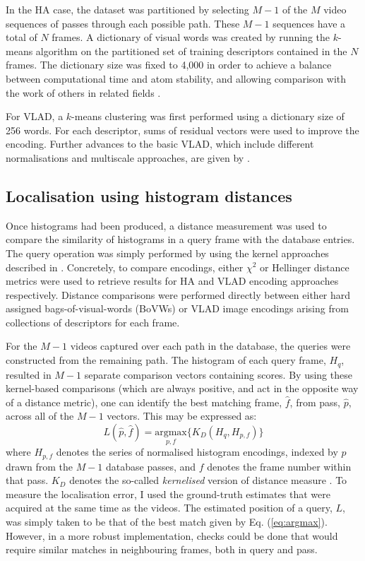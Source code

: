 In the HA case, the dataset was partitioned by selecting $M-1$ of the $M$ video sequences of passes through each possible path. These $M-1$ sequences have a total of $N$ frames. A dictionary of visual words was created by running the $k$-means algorithm on the partitioned set of training descriptors contained in the $N$ frames. The dictionary size was fixed to 4,000 in order to achieve a balance between computational time and atom stability, and allowing comparison with the work of others in related fields \cite{Chatfield2011}.

For VLAD, a $k$-means clustering was first performed using a dictionary size of 256 words. For each descriptor, sums of residual vectors were used to improve the encoding.  Further advances to the basic VLAD, which include different normalisations and multiscale approaches, are given by \cite{Arandjelovic}. 

\subsection{Localisation using histogram distances}
\label{sec:kernel_encodings}
Once histograms had been produced, a distance measurement was used to compare the similarity of histograms in a query frame with the database entries.  The query operation was simply performed by using the kernel approaches described in \cite{Vedaldi2010}.  Concretely, to compare encodings, either $\chi^2$ or Hellinger distance metrics \citep{Vedaldi2012} were used to retrieve results for HA and VLAD encoding approaches respectively. Distance comparisons were performed directly between either hard assigned bags-of-visual-words (BoVWs) or VLAD image encodings arising from collections of descriptors for each frame. 

For the $M-1$ videos captured over each path in the database, the queries were constructed from the remaining path. The histogram of each query frame, $H_q$, resulted in $M-1$ separate comparison vectors containing scores.  By using these kernel-based comparisons (which are always positive, and act in the opposite way of a distance metric), one can identify the best matching frame, $\hat{f}$, from pass, $\hat{p}$, across all of the $M-1$ vectors.  This may be expressed as: 
\begin{equation}
L(\hat{p},\hat{f}) = \underset{p,f}{\textrm{argmax}} \lbrace K_{D}(H_q,H_{p,f})\rbrace
\label{eq:argmax}
\end{equation}
where $H_{p,f}$ denotes the series of normalised histogram encodings, indexed by $p$ drawn from the $M-1$ database passes, and $f$ denotes the frame number within that pass. $K_D$ denotes the so-called \textit{kernelised} version of distance measure \cite{Vedaldi2010}.  To measure the localisation error, I used the ground-truth estimates that were acquired at the same time as the videos. The estimated position of a query, $L$, was simply taken to be that of the best match given by Eq. (\ref{eq:argmax}).  However, in a more robust implementation, checks could be done that would require similar matches in neighbouring frames, both in query and pass.


